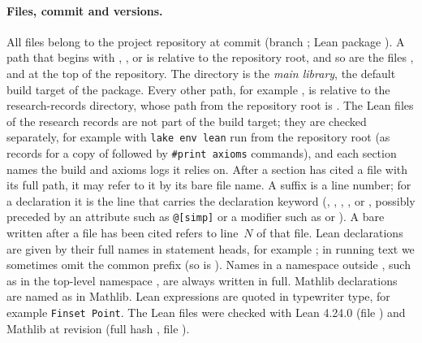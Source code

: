 \paragraph{Files, commit and versions.}
All files belong to the project repository at commit  (branch
; Lean package ). A path that begins with
, ,  or  is relative to the
repository root, and so are the files ,  and
 at the top of the repository. The directory  is the \emph{main
library}, the default build target of the package. Every other path, for example
, is relative to the research-records directory, whose path from the
repository root is . The Lean files of the research records are not
part of the build target; they are checked separately, for example with \texttt{lake env lean} run from
the repository root (as  records for a copy of
 followed by \texttt{\#print axioms} commands), and each section names the
build and axioms logs it relies on. After a section has cited a file with its full path, it may refer to
it by its bare file name. A suffix  is a line number; for a declaration it is the line that
carries the declaration keyword (, , , ,
 or , possibly preceded by an attribute such as \texttt{@[simp]} or a
modifier such as  or ). A bare  written after a file has been
cited refers to line~$N$ of that file. Lean declarations
are given by their full names in statement heads, for
example ; in running text we sometimes omit the
common prefix  (so  is
). Names in a namespace outside , such as
 in the top-level namespace , are always written in
full. Mathlib declarations are named as in Mathlib. Lean expressions are quoted in typewriter type, for
example \texttt{Finset Point}.
The Lean files were checked with Lean 4.24.0 (file ) and Mathlib at revision
 (full hash , file
).

